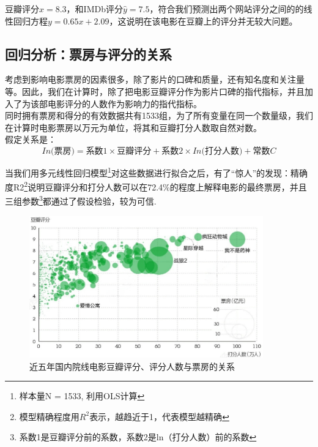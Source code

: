 \documentclass[12pt,a4paper,utf8]{article}
\begin{document}
豆瓣评分$x = 8.3$，和IMDb评分$\hat{y} = 7.5$，符合我们预测出两个网站评分之间的的线性回归方程$y = 0.65x + 2.09$，这说明在该电影在豆瓣上的评分并无较大问题。\\

\subsection{回归分析：票房与评分的关系}

考虑到影响电影票房的因素很多，除了影片的口碑和质量，还有知名度和关注量等。因此，我们在计算时，除了把电影豆瓣评分作为影片口碑的指代指标，并且加入了为该部电影评分的人数作为影响力的指代指标。\\

同时拥有票房和得分的有效数据共有1533组，为了所有变量在同一个数量级，我们在计算时电影票房以万元为单位，将其和豆瓣打分人数取自然对数。\\

假定关系是：
\begin{equation}
    In\mbox{(票房})= \mbox{系数1} \times \mbox{豆瓣评分} + \mbox{系数2}  \times In\mbox{(打分人数)} + \mbox{常数}C
\end{equation}


当我们用多元线性回归模型\footnote{样本量N = 1533, 利用OLS计算}对这些数据进行拟合之后，有了“惊人”的发现：精确度R2\footnote{模型精确程度用$R^{2}$表示，越趋近于1，代表模型越精确}说明豆瓣评分和打分人数可以在72.4\%的程度上解释电影的最终票房，并且三组参数\footnote{系数1是豆瓣评分前的系数，系数2是ln（打分人数）前的系数}都通过了假设检验，较为可信.\\

\begin{figure}[H]
    \centering
    \includegraphics[width=0.9\textwidth]{images/打分-票房.jpg} 
    \caption{近五年国内院线电影豆瓣评分、评分人数与票房的关系}
\end{figure}  
\end{document}
